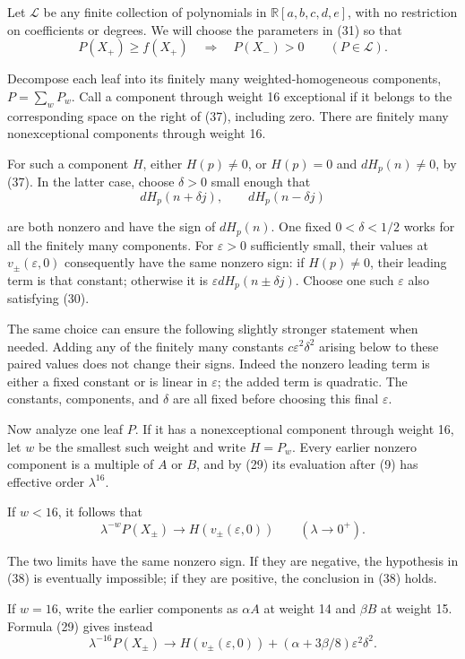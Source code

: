 \documentclass[11pt]{article}
\begin{document}
Let \(\mathcal L\) be any finite collection of polynomials in
\(\mathbb R[a,b,c,d,e]\), with no restriction on coefficients or degrees.
We will choose the parameters in (31) so that
\[
P(X_+)\ge f(X_+)\quad\Longrightarrow\quad P(X_-)>0
\qquad(P\in\mathcal L).
\tag{38}
\]

Decompose each leaf into its finitely many weighted-homogeneous components,
\(P=\sum_w P_w\). Call a component through weight 16 exceptional if
it belongs to the corresponding space on the right of (37), including zero.
There are finitely many nonexceptional components through weight 16.

For such a component \(H\), either \(H(p)\ne0\), or
\(H(p)=0\) and \(dH_p(n)\ne0\), by (37). In the latter case,
choose \(\delta>0\) small enough that
\[
dH_p(n+\delta j),\qquad dH_p(n-\delta j)
\]

are both nonzero and have the sign of \(dH_p(n)\). One fixed
\(0<\delta<1/2\) works for all the finitely many components.
For \(\varepsilon>0\) sufficiently small, their values at
\(v_\pm(\varepsilon,0)\) consequently have the same nonzero sign:
if \(H(p)\ne0\), their leading term is that constant; otherwise it
is \(\varepsilon dH_p(n\pm\delta j)\). Choose one such
\(\varepsilon\) also satisfying (30).

The same choice can ensure the following slightly stronger statement when
needed. Adding any of the finitely many constants
\(c\varepsilon^2\delta^2\) arising below to these paired values does
not change their signs. Indeed the nonzero leading term is either a fixed
constant or is linear in \(\varepsilon\); the added term is quadratic.
The constants, components, and \(\delta\) are all fixed before choosing
this final \(\varepsilon\).

Now analyze one leaf \(P\). If it has a nonexceptional component through
weight 16, let \(w\) be the smallest such weight and write \(H=P_w\).
Every earlier nonzero component is a multiple of \(A\) or \(B\), and
by (29) its evaluation after (9) has effective order \(\lambda^{16}\).

If \(w<16\), it follows that
\[
\lambda^{-w}P(X_\pm)\longrightarrow H(v_\pm(\varepsilon,0))
\qquad(\lambda\to0^+).
\tag{39}
\]

The two limits have the same nonzero sign. If they are negative, the
hypothesis in (38) is eventually impossible; if they are positive,
the conclusion in (38) holds.

If \(w=16\), write the earlier components as \(\alpha A\) at
weight 14 and \(\beta B\) at weight 15. Formula (29) gives instead
\[
\lambda^{-16}P(X_\pm)\longrightarrow
H(v_\pm(\varepsilon,0))
 +(\alpha+3\beta/8)\varepsilon^2\delta^2.
\tag{40}
\]
\end{document}
